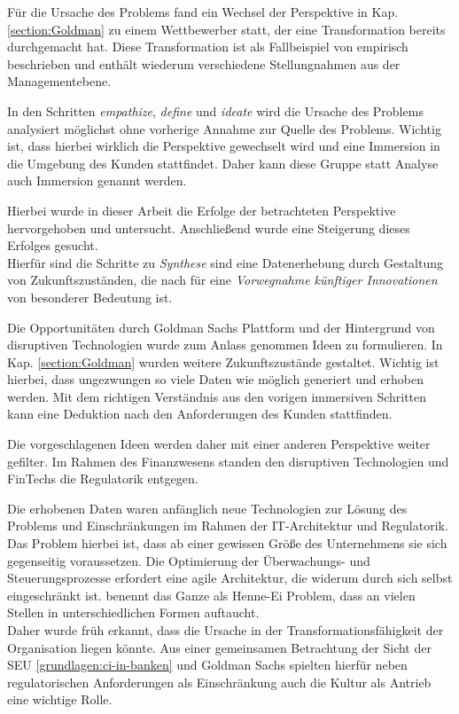 Für die Ursache des Problems fand ein Wechsel der Perspektive in Kap. \ref{section:Goldman} zu einem Wettbewerber statt, der eine Transformation bereits durchgemacht hat. Diese Transformation ist als Fallbeispiel von \citet{Gupta:2017} empirisch beschrieben und enthält wiederum verschiedene Stellungnahmen aus der Managementebene.

In den Schritten \emph{empathize}, \emph{define} und \emph{ideate} wird die Ursache des Problems analysiert möglichst ohne vorherige Annahme zur Quelle des Problems. Wichtig ist, dass hierbei wirklich die Perspektive gewechselt wird und eine Immersion in die Umgebung des Kunden stattfindet. Daher kann diese Gruppe statt Analyse \cite{yüksel:digit} auch Immersion genannt werden. 

Hierbei wurde in dieser Arbeit die Erfolge der betrachteten Perspektive hervorgehoben und untersucht. Anschließend wurde eine Steigerung dieses Erfolges gesucht.
\medskip
\\
Hierfür sind die Schritte zu \emph{Synthese} sind eine Datenerhebung \cite[S. 61]{yüksel:digit} durch Gestaltung von Zukunftszuständen, die nach \citet[S. 14]{Alt2017} für eine \emph{Vorwegnahme künftiger Innovationen} von besonderer Bedeutung ist. 

Die Opportunitäten durch Goldman Sachs Plattform \cite{Gupta:2017} und der Hintergrund von disruptiven Technologien \cite{Fernandez:2020} wurde zum Anlass genommen Ideen zu formulieren. In Kap. \ref{section:Goldman} wurden weitere Zukunftszustände gestaltet.
Wichtig ist hierbei, dass ungezwungen so viele Daten wie möglich generiert und erhoben werden. Mit dem richtigen Verständnis aus den vorigen immersiven Schritten kann eine Deduktion nach den Anforderungen des Kunden stattfinden. 

Die vorgeschlagenen Ideen werden daher mit einer anderen Perspektive weiter gefilter. Im Rahmen des Finanzwesens standen den disruptiven Technologien und FinTechs die Regulatorik entgegen.

Die erhobenen Daten waren anfänglich neue Technologien zur Lösung des Problems und Einschränkungen im Rahmen der IT-Architektur und Regulatorik. Das Problem hierbei ist, dass ab einer gewissen Größe des Unternehmens sie sich gegenseitig voraussetzen. Die Optimierung der Überwachungs- und Steuerungsprozesse erfordert eine agile Architektur, die widerum durch sich selbst eingeschränkt ist. \citet{Ganswindt2006} benennt das Ganze als Henne-Ei Problem, dass an vielen Stellen in unterschiedlichen Formen auftaucht.
\medskip
\\
Daher wurde früh erkannt, dass die Ursache in der Transformationsfähigkeit der Organisation liegen könnte. Aus einer gemeinsamen Betrachtung der Sicht der \ac{SEU} \ref{grundlagen:ci-in-banken} und Goldman Sachs \cite{Gupta:2017} spielten hierfür neben regulatorischen Anforderungen als Einschränkung auch die Kultur als Antrieb eine wichtige Rolle.

